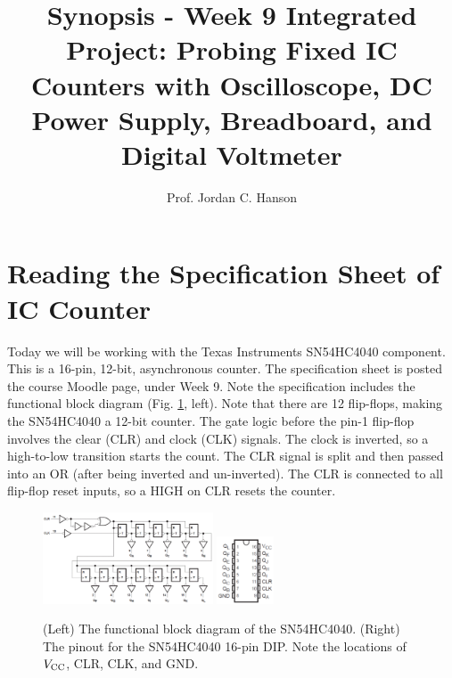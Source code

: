 \documentclass{article}
\begin{document}
\title{Synopsis - Week 9 Integrated Project: Probing Fixed IC Counters with Oscilloscope, DC Power Supply, Breadboard, and Digital Voltmeter}
\author{Prof. Jordan C. Hanson}

\maketitle

\section{Reading the Specification Sheet of IC Counter}

Today we will be working with the Texas Instruments SN54HC4040 component.  This is a 16-pin, 12-bit, asynchronous counter.  The specification sheet is posted the course Moodle page, under Week 9.  Note the specification includes the functional block diagram (Fig. \ref{fig:count1}, left).  Note that there are 12 flip-flops, making the SN54HC4040 a 12-bit counter.  The gate logic before the pin-1 flip-flop involves the clear (CLR) and clock (CLK) signals.  The clock is inverted, so a high-to-low transition starts the count.  The CLR signal is split and then passed into an OR (after being inverted and un-inverted).  The CLR is connected to all flip-flop reset inputs, so a HIGH on CLR resets the counter.

\begin{figure}[ht]
\centering
\includegraphics[width=0.45\textwidth]{counter_1.png} \hspace{1cm}
\includegraphics[width=0.15\textwidth]{counter_2.png}
\caption{\label{fig:count1} (Left) The functional block diagram of the SN54HC4040. (Right) The pinout for the SN54HC4040 16-pin DIP.  Note the locations of $V_{\rm CC}$, CLR, CLK, and GND.}
\end{figure}
\end{document}
